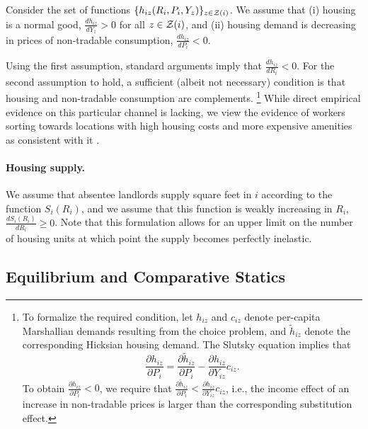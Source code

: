 \begin{assu}\label{assu:housing_demand}
    Consider the set of functions $\{h_{iz} (R_i, P_i, Y_z)\}_{z\in\mathcal{Z}(i)}$.
    We assume that
    (i) housing is a normal good, 
    $\frac{d h_{iz}}{d Y_z} > 0$ for all $z\in\mathcal{Z}(i)$,
    and
    (ii) housing demand is decreasing in prices of non-tradable consumption, 
    $\frac{d h_{iz}}{d P_i} < 0$.
\end{assu}

Using the first assumption, standard arguments imply that 
$\frac{d h_{iz}}{d R_i} < 0$.
For the second assumption to hold, 
a sufficient (albeit not necessary) condition is that housing and non-tradable
consumption are complements.%
\footnote{To formalize the required condition, let $h_{iz}$ and $c_{iz}$ denote 
    per-capita Marshallian demands resulting from the choice problem, and 
    $\tilde h_{iz}$ denote the corresponding Hicksian housing demand.
    The Slutsky equation implies that
    $$\frac{\partial h_{iz}}{\partial P_i}
    = \frac{\partial \tilde h_{iz}}{\partial P_i}
    - \frac{\partial h_{iz}}{\partial Y_{iz}} c_{iz}.$$
    To obtain $\frac{\partial h_{iz}}{\partial P_i} < 0$, we require that
    $\frac{\partial \tilde h_{iz}}{\partial P_i}
    < \frac{\partial h_{iz}}{\partial Y_{iz}} c_{iz}$, i.e., the income effect 
    of an increase in non-tradable prices is larger than the corresponding 
    substitution effect.}
While direct empirical evidence on this particular channel is lacking,
we view the evidence of workers sorting towards locations with high housing 
costs and more expensive amenities as consistent with it 
\parencite[e.g.,][]{CoutureEtAl2019}.

\paragraph{Housing supply.}

We assume that absentee landlords supply square feet in $i$ according to the 
function $S_i(R_i)$,
and we assume that this function is weakly increasing in $R_i$, 
$\frac{d S_i(R_i)}{d R_i} \ge 0$.
Note that this formulation allows for an upper limit on the number of housing 
units at which point the supply becomes perfectly inelastic.


\subsection{Equilibrium and Comparative Statics}


